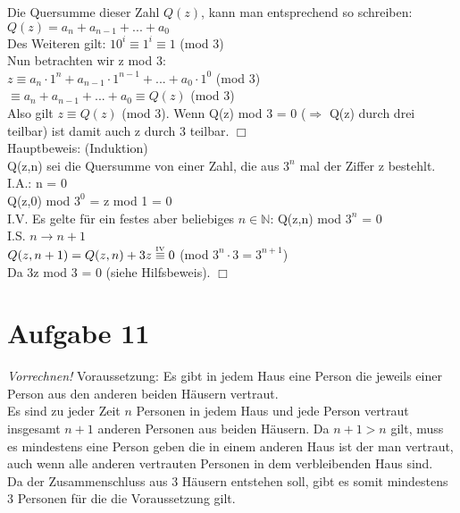 \documentclass[paper = a4, ngerman]{scrartcl}
\begin{document}
Die Quersumme dieser Zahl $Q(z)$, kann man entsprechend so schreiben:\\
$Q(z) = a_n + a_{n-1} + ... + a_0$\\

Des Weiteren gilt: $10^i \equiv 1^i \equiv 1$ (mod 3)\\

Nun betrachten wir z mod 3:\\

$z \equiv a_n \cdot 1^n + a_{n-1} \cdot 1^{n-1} + ... + a_0 \cdot 1^0$ (mod 3)\\
$\equiv a_n + a_{n-1} + ... + a_0 \equiv Q(z)$ (mod 3) \\

Also gilt $z \equiv Q(z)$ (mod 3). Wenn Q(z) mod 3 = 0 ($\Rightarrow$ Q(z) durch drei teilbar) ist damit auch z durch 3 teilbar.
\hfill$\Box$\\

Hauptbeweis: (Induktion)\\

Q(z,n) sei die Quersumme von einer Zahl, die aus $3^n$ mal der Ziffer z bestehlt.\\

I.A.: n = 0\\

Q(z,0) mod $3^0$ = z mod 1 = 0 \\

I.V. Es gelte für ein festes aber beliebiges $n \in \mathbb{N}$: Q(z,n) mod $3^n$ = 0\\

I.S. $n \to n+1$\\

$Q(z, n+1) = Q(z, n) + 3z \overset{\text{\tiny{IV}}}{\equiv} 0$ (mod $3^n \cdot 3 = 3^{n+1}$) \\
Da 3z mod 3 = 0 (siehe Hilfsbeweis).
\hfill$\Box$



\pagebreak
	\section*{Aufgabe 11}
		\textit{Vorrechnen!}
		Voraussetzung: Es gibt in jedem Haus eine Person die jeweils einer Person aus den anderen beiden Häusern vertraut.\\
		Es sind zu jeder Zeit $n$ Personen in jedem Haus und jede Person vertraut insgesamt $n+1$ anderen Personen aus beiden Häusern. Da $n+1 > n$ gilt, muss es mindestens eine Person geben die in einem anderen Haus ist der man vertraut, auch wenn alle anderen vertrauten Personen in dem verbleibenden Haus sind.\\
		Da der Zusammenschluss aus 3 Häusern entstehen soll, gibt es somit mindestens 3 Personen für die die Voraussetzung gilt.
\end{document}
